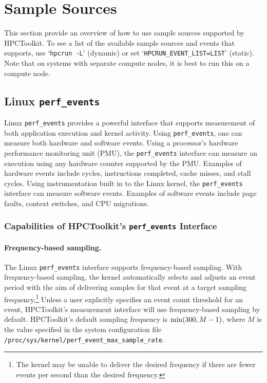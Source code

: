 
\section{Sample Sources}
\label{sample-sources}

This section provide an overview of how to use sample sources supported by HPCToolkit.  To
see a list of the available sample sources and events that \hpcrun{}
supports, use `\verb|hpcrun -L|' (dynamic) or set
`\verb|HPCRUN_EVENT_LIST=LIST|' (static).  Note that on systems with
separate compute nodes, it is best to run this on a compute node.

\newcommand{\perfevents}{{\tt perf\_events}}

\subsection{Linux \perfevents}

Linux \perfevents{} provides a powerful interface that supports 
measurement of both application execution and kernel activity. 
Using
\perfevents{}, one can measure both hardware and software events. 
Using a processor's hardware performance monitoring unit (PMU), the
\perfevents{} interface can measure an execution using any hardware counter
supported by the PMU. Examples of hardware events include cycles, instructions
completed, cache misses, and stall cycles. Using instrumentation built in to the Linux kernel,
the \perfevents{} interface can measure software events. Examples of software events include page
faults, context switches, and CPU migrations. 



\subsubsection{Capabilities of HPCToolkit's \perfevents{} Interface}

\paragraph{Frequency-based sampling.} 
The Linux \perfevents{} interface supports frequency-based sampling. 
With frequency-based sampling, the kernel automatically selects and adjusts an event period with the
aim of delivering samples for that event at a target sampling frequency.\footnote{The 
kernel may be unable to deliver the desired frequency if 
there are fewer events per second than the desired frequency.}  
Unless a user explicitly specifies an event count threshold for an event, 
HPCToolkit's measurement interface will use frequency-based sampling by default.  
HPCToolkit's default sampling frequency is ${\rm min}(300,M-1)$, where $M$ is the 
value specified in the system configuration file \verb|/proc/sys/kernel/perf_event_max_sample_rate|.


